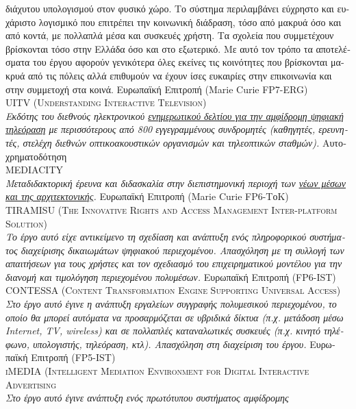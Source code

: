 \documentclass[11pt, a4paper]{article}
\newcommand{\note}[1]{\marginnote{\scriptsize #1}}
\begin{document}
\begin{greek}
{διάχυτου υπολογισμού στον φυσικό χώρο. Το σύστημα περιλαμβάνει εύχρηστο
και ευχάριστο λογισμικό που επιτρέπει την κοινωνική διάδραση, τόσο από
μακρυά όσο και από κοντά, με πολλαπλά μέσα και συσκευές χρήστη. Τα
σχολεία που συμμετέχουν βρίσκονται τόσο στην Ελλάδα όσο και στο
εξωτερικό. Με αυτό τον τρόπο τα αποτελέσματα του έργου αφορούν
γενικότερα όλες εκείνες τις κοινότητες που βρίσκονται μακρυά από τις
πόλεις αλλά επιθυμούν να έχουν ίσες ευκαιρίες στην επικοινωνία και στην
συμμετοχή στα κοινά.} Ευρωπαϊκή Επιτροπή (Marie Curie FP7-ERG)\\[.2cm]
\note{2002--2010}\textsc{UITV (Understanding Interactive Television)}\\
\emph{Εκδότης του διεθνούς ηλεκτρονικού
\href{https://www.freelists.org/archive/uitv/}{ενημερωτικού δελτίου για
την αμφίδρομη ψηφιακή τηλεόραση} με περισσότερους από 800 εγγεγραμμένους
συνδρομητές (καθηγητές, ερευνητές, στελέχη διεθνών οπτικοακουστικών
οργανισμών και τηλεοπτικών σταθμών).} Αυτοχρηματοδότηση\\[.2cm]
\note{2006--2008}\textsc{MEDIACITY}\\
\emph{Μεταδιδακτορική έρευνα και διδασκαλία στην διεπιστημονική περιοχή
των \href{http://www.uni-weimar.de/mediaarchitecture}{νέων μέσων και της
αρχιτεκτονικής}.} Ευρωπαϊκή Επιτροπή (Marie Curie FP6-ΤοΚ)\\[.2cm]
\note{2004--2005}\textsc{TIRAMISU (The Innovative Rights and Access
Management Inter-platform Solution)}\\
\emph{Το έργο αυτό είχε αντικείμενο τη σχεδίαση και ανάπτυξη ενός
πληροφορικού συστήματος διαχείρισης δικαιωμάτων ψηφιακού περιεχομένου.
Απασχόληση με τη συλλογή των απαιτήσεων για τους χρήστες και τον
σχεδιασμό του επιχειρηματικού μοντέλου για την διανομή και τιμολόγηση
περιεχομένου πολυμέσων.} Ευρωπαϊκή Επιτροπή (FP6-IST)\\[.2cm]
\note{2001--2003}\textsc{CONTESSA (Content Transformation Engine
Supporting Universal Access)}\\
\emph{Στο έργο αυτό έγινε η ανάπτυξη εργαλείων συγγραφής πολυμεσικού
περιεχομένου, το οποίο θα μπορεί αυτόματα να προσαρμόζεται σε υβριδικά
δίκτυα (π.χ. μετάδοση μέσω Internet, TV, wireless) και σε πολλαπλές
καταναλωτικές συσκευές (π.χ. κινητό τηλέφωνο, υπολογιστής, τηλεόραση,
κτλ). Απασχόληση στη διαχείριση του έργου.} Ευρωπαϊκή Επιτροπή
(FP5-IST)\\[.2cm]
\note{2000--2001}\textsc{iMEDIA (Intelligent Mediation Environment for
Digital Interactive Advertising}\\
\emph{Στο έργο αυτό έγινε ανάπτυξη ενός πρωτότυπου συστήματος αμφίδρομης
}
\end{greek}
\end{document}
